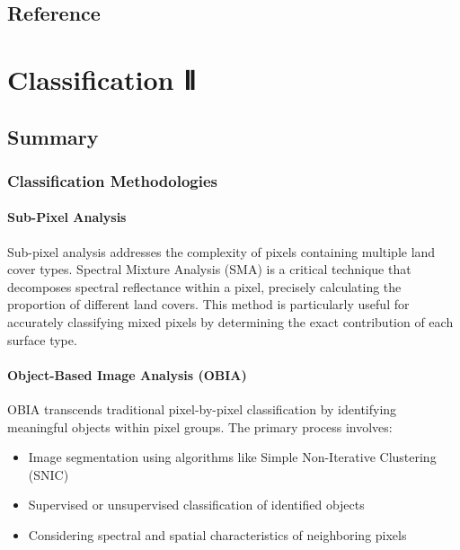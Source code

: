 \documentclass[
  letterpaper,
]{scrbook}
\begin{document}
\section{Reference}\label{reference-4}


\chapter{Classification Ⅱ}\label{classification-ux2171}

\section{Summary}\label{summary-4}

\subsection{Classification
Methodologies}\label{classification-methodologies}

\subsubsection{Sub-Pixel Analysis}\label{sub-pixel-analysis}

Sub-pixel analysis addresses the complexity of pixels containing
multiple land cover types. Spectral Mixture Analysis (SMA) is a critical
technique that decomposes spectral reflectance within a pixel, precisely
calculating the proportion of different land covers. This method is
particularly useful for accurately classifying mixed pixels by
determining the exact contribution of each surface type.

\subsubsection{Object-Based Image Analysis
(OBIA)}\label{object-based-image-analysis-obia}

OBIA transcends traditional pixel-by-pixel classification by identifying
meaningful objects within pixel groups. The primary process involves:

\begin{itemize}
\item
  Image segmentation using algorithms like Simple Non-Iterative
  Clustering (SNIC)
\item
  Supervised or unsupervised classification of identified objects
\item
  Considering spectral and spatial characteristics of neighboring pixels
\end{itemize}
\end{document}
